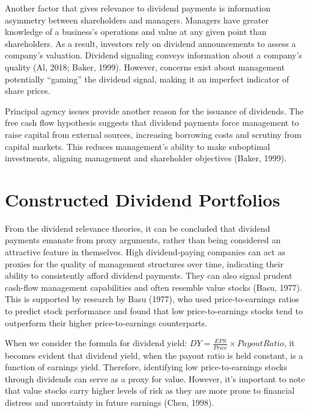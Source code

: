 \documentclass[11pt,preprint, authoryear]{elsarticle}
\numberwithin{equation}{section}
\numberwithin{figure}{section}
\numberwithin{table}{section}
\begin{document}
Another factor that gives relevance to dividend payments is information
asymmetry between shareholders and managers. Managers have greater
knowledge of a business's operations and value at any given point than
shareholders. As a result, investors rely on dividend announcements to
assess a company's valuation. Dividend signaling conveys information
about a company's quality (Al, 2018; Baker, 1999). However, concerns
exist about management potentially ``gaming'' the dividend signal,
making it an imperfect indicator of share prices.

Principal agency issues provide another reason for the issuance of
dividends. The free cash flow hypothesis suggests that dividend payments
force management to raise capital from external sources, increasing
borrowing costs and scrutiny from capital markets. This reduces
management's ability to make suboptimal investments, aligning management
and shareholder objectives (Baker, 1999).

\hypertarget{constructed-dividend-portfolios}{%
\section*{Constructed Dividend
Portfolios}\label{constructed-dividend-portfolios}}

From the dividend relevance theories, it can be concluded that dividend
payments emanate from proxy arguments, rather than being considered an
attractive feature in themselves. High dividend-paying companies can act
as proxies for the quality of management structures over time,
indicating their ability to consistently afford dividend payments. They
can also signal prudent cash-flow management capabilities and often
resemble value stocks (Basu, 1977). This is supported by research by
Basu (1977), who used price-to-earnings ratios to predict stock
performance and found that low price-to-earnings stocks tend to
outperform their higher price-to-earnings counterparts.

When we consider the formula for dividend yield:
\(DY = \frac{EPS}{Price} \times Payout Ratio\), it becomes evident that
dividend yield, when the payout ratio is held constant, is a function of
earnings yield. Therefore, identifying low price-to-earnings stocks
through dividends can serve as a proxy for value. However, it's
important to note that value stocks carry higher levels of risk as they
are more prone to financial distress and uncertainty in future earnings
(Chen, 1998).
\end{document}
